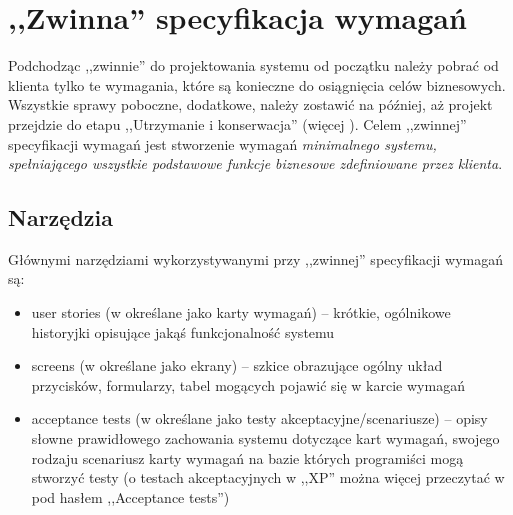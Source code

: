 \section{,,Zwinna'' specyfikacja wymagań}
\label{sec:zwinnaSpecyfikacjaWymagan}

Podchodząc ,,zwinnie'' do projektowania systemu od początku należy pobrać od klienta tylko te wymagania, które są konieczne do osiągnięcia celów biznesowych. Wszystkie sprawy poboczne, dodatkowe, należy zostawić na później, aż projekt przejdzie do etapu ,,Utrzymanie i konserwacja'' (więcej ). Celem ,,zwinnej'' specyfikacji wymagań jest stworzenie wymagań \emph{minimalnego systemu, spełniającego wszystkie podstawowe funkcje biznesowe zdefiniowane przez klienta}.

\subsection{Narzędzia}
\label{sec:ZSWnarzedzia}

Głównymi narzędziami wykorzystywanymi przy ,,zwinnej'' specyfikacji wymagań są:
\begin{itemize}
    \item user stories (w \cite{Mad09} określane jako karty wymagań) -- krótkie, ogólnikowe historyjki opisujące jakąś funkcjonalność systemu
    \item screens (w \cite{Mad09} określane jako ekrany) -- szkice obrazujące ogólny układ przycisków, formularzy, tabel mogących pojawić się w karcie wymagań
    \item acceptance tests (w \cite{Mad09} określane jako testy akceptacyjne/scenariusze) -- opisy słowne prawidłowego zachowania systemu dotyczące kart wymagań, swojego rodzaju scenariusz karty wymagań na bazie których programiści mogą stworzyć testy (o testach akceptacyjnych w ,,XP'' można więcej przeczytać w \cite{Jef00} pod hasłem ,,Acceptance tests'')  
\end{itemize}

